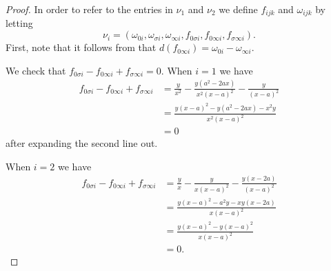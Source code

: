\documentclass[draft, 11pt]{article} %
\theoremstyle{plain}
\theoremstyle{remark}
\begin{document}
\begin{proof}
In order to refer to the entries in $\nu_1$ and $\nu_2$ we define $f_{ijk}$ and $\omega_{ijk}$ by letting
\[
\nu_i = \left( \omega_{0 i}, \omega_{\sigma i}, \omega_{\infty i}, f_{0 \sigma i}, f_{0 \infty i}, f_{\sigma \infty i} \right).
\]
First, note that it follows from  that $d(f_{0 \infty i}) = \omega_{0 i} - \omega_{\infty i}$.

We check that $f_{0 \sigma i} - f_{0 \infty i}+ f_{\sigma \infty i} = 0$.
When $i=1$ we have
\begin{align*}
f_{0 \sigma i} - f_{0 \infty i}+ f_{\sigma \infty i} & = \frac{y}{x^2} - \frac{y(a^2-2ax)}{x^2(x-a)^2} - \frac{y}{(x-a)^2} \\
& = \frac{y(x-a)^2 - y(a^2-2ax) - x^2y}{x^2(x-a)^2} \\
& = 0
\end{align*}
after expanding the second line out.

When $i=2$ we have
\begin{align}
f_{0 \sigma i} - f_{0 \infty i}+ f_{\sigma \infty i} & = \frac{y}{x} - \frac{y}{x(x-a)^2} - \frac{y(x-2a)}{(x-a)^2} \\
& = \frac{y(x-a)^2 - a^2y -xy(x-2a)}{x(x-a)^2} \\
& = \frac{y(x-a)^2 - y(x-a)^2}{x(x-a)^2} \\
& = 0.
\end{align}


\end{proof}
\end{document}
